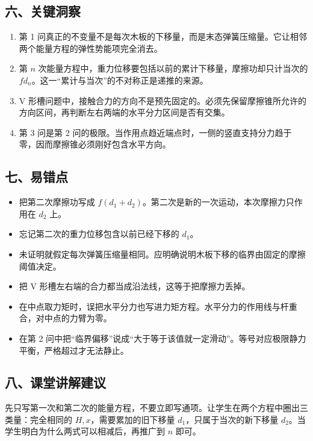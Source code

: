 \documentclass[12pt,a4paper,UTF8]{ctexart}
\newcommand{\tightlist}{\setlength{\itemsep}{0pt}\setlength{\parskip}{0pt}}
\begin{document}
\subsection{六、关键洞察}\label{ux516dux5173ux952eux6d1eux5bdf}

\begin{enumerate}
\def\labelenumi{\arabic{enumi}.}
\tightlist
\item
  第 1
  问真正的不变量不是每次木板的下移量，而是末态弹簧压缩量。它让相邻两个能量方程的弹性势能项完全消去。
\item
  第 \(n\)
  次能量方程中，重力位移要包括以前的累计下移量，摩擦功却只计当次的
  \(fd_n\)。这一``累计与当次''的不对称正是递推的来源。
\item
  V
  形槽问题中，接触合力的方向不是预先固定的。必须先保留摩擦锥所允许的方向区间，再判断左右两端的水平分力区间是否有交集。
\item
  第 3 问是第 2
  问的极限。当作用点趋近端点时，一侧的竖直支持分力趋于零，因而摩擦锥必须刚好包含水平方向。
\end{enumerate}

\subsection{七、易错点}\label{ux4e03ux6613ux9519ux70b9}

\begin{itemize}
\tightlist
\item
  把第二次摩擦功写成
  \(f(d_1+d_2)\)。第二次是新的一次运动，本次摩擦力只作用在 \(d_2\) 上。
\item
  忘记第二次的重力位移包含以前已经下移的 \(d_1\)。
\item
  未证明就假定每次弹簧压缩量相同。应明确说明木板下移的临界由固定的摩擦阈值决定。
\item
  把 V 形槽左右端的合力都当成沿法线，这等于把摩擦力丢掉。
\item
  在中点取力矩时，误把水平分力也写进力矩方程。水平分力的作用线与杆重合，对中点的力臂为零。
\item
  在第 2
  问中把``临界偏移''说成``大于等于该值就一定滑动''。等号对应极限静力平衡，严格超过才无法静止。
\end{itemize}

\subsection{八、课堂讲解建议}\label{ux516bux8bfeux5802ux8bb2ux89e3ux5efaux8bae}

先只写第一次和第二次的能量方程，不要立即写通项。让学生在两个方程中圈出三类量：完全相同的
\(H,x\)，需要累加的旧下移量 \(d_1\)，只属于当次的新下移量
\(d_2\)。当学生明白为什么两式可以相减后，再推广到 \(n\) 即可。
\end{document}
